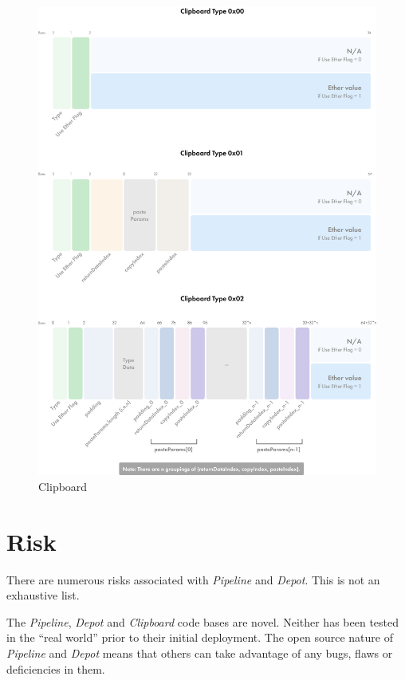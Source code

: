 \documentclass[tikz]{article}
\newcommand{\term}[1]{\textsl{#1}}
\begin{document}
\begin{figure}[h!]
    \centering
    \includegraphics[scale=.89]{Figure2}
    \caption{Clipboard}
    \label{fig 2}
\end{figure}

\newpage
\section{Risk}
There are numerous risks associated with \term{Pipeline} and \term{Depot}. This is not an exhaustive list.

The \term{Pipeline}, \term{Depot} and \term{Clipboard} code bases are novel. Neither has been tested in the “real world” prior to their initial deployment. The open source nature of \term{Pipeline} and \term{Depot} means that others can take advantage of any bugs, flaws or deficiencies in them.
\end{document}
